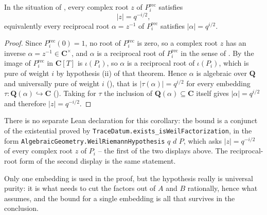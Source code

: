 \begin{corollary}
\label{cor:zla-riemann-hypothesis}
\leanok
In the situation of , every complex root $z$
of $P_i^{\mathrm{rec}}$ satisfies
\[
  |z|=q^{-i/2},
\]
equivalently every reciprocal root $\alpha=z^{-1}$ of $P_i^{\mathrm{rec}}$
satisfies $|\alpha|=q^{i/2}$.
\end{corollary}
\begin{proof}
\leanok
Since $P_i^{\mathrm{rec}}(0)=1$, no root of $P_i^{\mathrm{rec}}$ is zero, so
a complex root $z$ has an inverse $\alpha=z^{-1}\in\mathbf C^\times$, and
$\alpha$ is a reciprocal root of $P_i^{\mathrm{rec}}$ in the sense of
.  By  the image of
$P_i^{\mathrm{rec}}$ in $\mathbf C[T]$ is $\iota(P_i)$, so $\alpha$ is a
reciprocal root of $\iota(P_i)$, which is pure of weight $i$ by hypothesis
(ii) of that theorem.  Hence $\alpha$ is algebraic over $\mathbf Q$ and
universally pure of weight $i$ (), that is
$|\tau(\alpha)|=q^{i/2}$ for every embedding
$\tau:\mathbf Q(\alpha)\hookrightarrow\mathbf C$
().  Taking for $\tau$ the inclusion of
$\mathbf Q(\alpha)\subseteq\mathbf C$ itself gives $|\alpha|=q^{i/2}$ and
therefore $|z|=q^{-i/2}$.
\end{proof}

There is no separate Lean declaration for this corollary: the bound is a
conjunct of the existential proved by
\texttt{TraceDatum.exists\_isWeilFactorization}, in the form
\texttt{AlgebraicGeometry.WeilRiemannHypothesis} $q$ $d$ $P$, which asks
$|z|=q^{-i/2}$ of every complex root $z$ of $P_i$ -- the first of
the two displays above.  The reciprocal-root form of the second display is the
same statement.

Only one embedding is used in the proof, but the hypothesis really is
universal purity: it is what  needs to cut the
factors out of $A$ and $B$ rationally, hence what
 assumes, and the bound for a single
embedding is all that survives in the conclusion.

